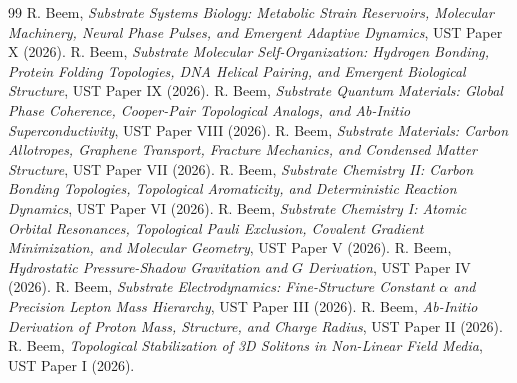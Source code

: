 \documentclass[11pt,a4paper]{article}
\begin{document}
	\begin{thebibliography}{99}
		 R. Beem, \textit{Substrate Systems Biology: Metabolic Strain Reservoirs, Molecular Machinery, Neural Phase Pulses, and Emergent Adaptive Dynamics}, UST Paper X (2026).
		 R. Beem, \textit{Substrate Molecular Self-Organization: Hydrogen Bonding, Protein Folding Topologies, DNA Helical Pairing, and Emergent Biological Structure}, UST Paper IX (2026).
		 R. Beem, \textit{Substrate Quantum Materials: Global Phase Coherence, Cooper-Pair Topological Analogs, and Ab-Initio Superconductivity}, UST Paper VIII (2026).
		 R. Beem, \textit{Substrate Materials: Carbon Allotropes, Graphene Transport, Fracture Mechanics, and Condensed Matter Structure}, UST Paper VII (2026).
		 R. Beem, \textit{Substrate Chemistry II: Carbon Bonding Topologies, Topological Aromaticity, and Deterministic Reaction Dynamics}, UST Paper VI (2026).
		 R. Beem, \textit{Substrate Chemistry I: Atomic Orbital Resonances, Topological Pauli Exclusion, Covalent Gradient Minimization, and Molecular Geometry}, UST Paper V (2026).
		 R. Beem, \textit{Hydrostatic Pressure-Shadow Gravitation and $G$ Derivation}, UST Paper IV (2026).
		 R. Beem, \textit{Substrate Electrodynamics: Fine-Structure Constant $\alpha$ and Precision Lepton Mass Hierarchy}, UST Paper III (2026).
		 R. Beem, \textit{Ab-Initio Derivation of Proton Mass, Structure, and Charge Radius}, UST Paper II (2026).
		 R. Beem, \textit{Topological Stabilization of 3D Solitons in Non-Linear Field Media}, UST Paper I (2026).
	\end{thebibliography}
	
\end{document}
